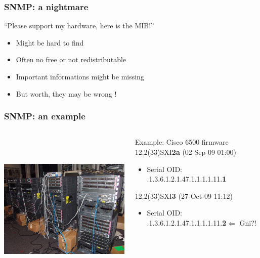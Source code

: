 \documentclass{beamer}
\begin{document}
\begin{frame}
    \frametitle{SNMP: a nightmare}

    \begin{block}{“Please support my hardware, here is the MIB!”}

    \pause
    \begin{itemize}
    \item Might be hard to find
    \item Often no free or not redistributable 
    \item Important informations might be missing
    \item But worth, they may be wrong !
    \end{itemize}
    \end{block}

\end{frame}
\begin{frame}
    \frametitle{SNMP: an example}

 \begin{columns}
 \begin{column}{0.35\textwidth}
         \includegraphics[height=7.5cm]{./pics/cisco.jpg}
 \end{column}
 \begin{column}{0.65\textwidth}
    \begin{block}{Example: Cisco 6500 firmware}
    12.2(33)SXI\textbf{2a} (02-Sep-09 01:00)
    \begin{itemize}
    \item Serial OID: .1.3.6.1.2.1.47.1.1.1.1.11.\textbf{1}
    \end{itemize}
    12.2(33)SXI\textbf{3} (27-Oct-09 11:12)
    \begin{itemize}
    \item Serial OID: .1.3.6.1.2.1.47.1.1.1.1.11.\textbf{2}$\Longleftarrow$ Gni?!
    \end{itemize}
    \end{block}

 \end{column}
\end{columns}


    
\end{frame}
\end{document}

